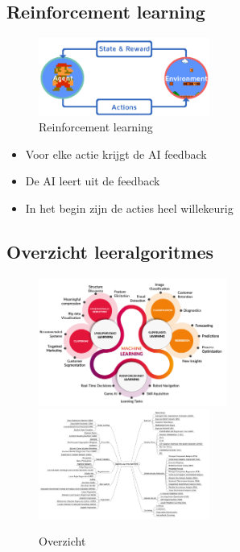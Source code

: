 \documentclass{article}
\begin{document}
\subsection{Reinforcement learning}

\begin{figure}[H]
    \centering
    \includegraphics[width=0.5\textwidth]{reinforcement-learning.png}
    \caption{Reinforcement learning}
\end{figure}

\begin{itemize}
    \item Voor elke actie krijgt de AI feedback
    \item De AI leert uit de feedback
    \item In het begin zijn de acties heel willekeurig
\end{itemize}

\subsection{Overzicht leeralgoritmes}

\begin{figure}[H]
    \centering
    \includegraphics[width=0.55\textwidth]{overzicht-leeralgoritmes.png}
    \includegraphics[width=0.5\textwidth]{overzicht-leeralgoritmes2.png}
    \caption{Overzicht}
\end{figure}
\end{document}
